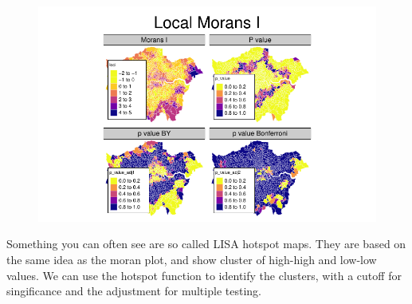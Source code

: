 \documentclass[
  letterpaper,
]{scrbook}
\begin{document}
\begin{figure}[H]

{\centering \includegraphics{04_dependence_files/figure-pdf/unnamed-chunk-18-1.pdf}

}

\end{figure}

Something you can often see are so called LISA hotspot maps. They are
based on the same idea as the moran plot, and show cluster of high-high
and low-low values. We can use the hotspot function to identify the
clusters, with a cutoff for singificance and the adjustment for multiple
testing.
\end{document}
